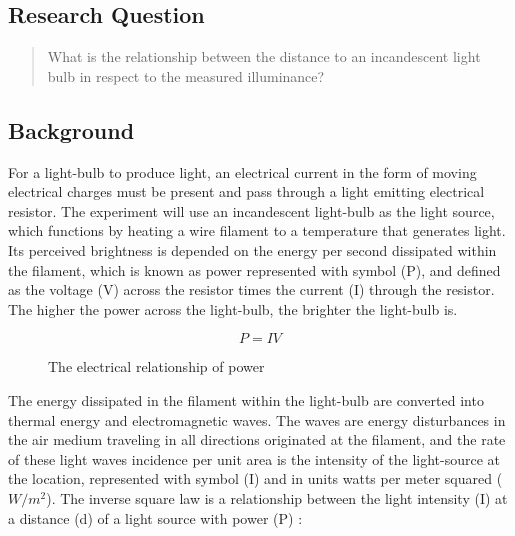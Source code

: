 \documentclass[a4paper,12pt]{article}
\begin{document}
\subsection{Research Question}
\begin{quote}
 What is the relationship between the distance to an incandescent light bulb in respect to the measured illuminance?
\end{quote}

\subsection{Background}

For a light-bulb to produce light, an electrical current in the form of moving electrical charges must be present and pass through a light emitting electrical resistor. The experiment will use an incandescent light-bulb as the light source, which functions by heating a wire filament to a temperature that generates light. Its perceived brightness is depended on the energy per second dissipated within the filament, which is known as power represented with symbol (P), and defined as the voltage (V) across the resistor times the current (I) through the resistor. The higher the power across the light-bulb, the brighter the light-bulb is.



\begin{figure}[h!]
    \[
    P = IV
    \]
    \caption{The electrical relationship of power}
    \label{eq:work}
\end{figure}

The energy dissipated in the filament within the light-bulb are converted into thermal energy and electromagnetic waves. The waves are energy disturbances in the air medium traveling in all directions originated at the filament, and the rate of these light waves incidence per unit area is the intensity of the light-source at the location, represented with symbol (I) and in units watts per meter squared ($\si{W/m^2}$). The inverse square law is a relationship between the light intensity (I) at a distance (d) of a light source with power (P) \parencite{isl}:
\end{document}
